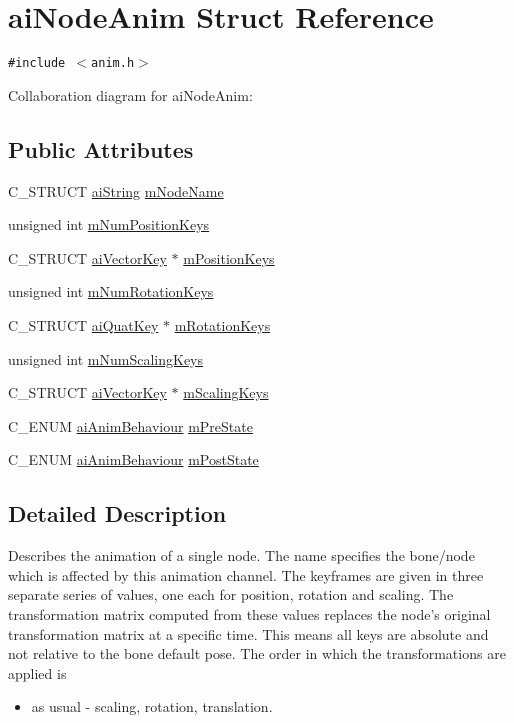\hypertarget{structai_node_anim}{
\section{aiNodeAnim Struct Reference}
\label{structai_node_anim}
}
{\tt \#include $<$anim.h$>$}

Collaboration diagram for aiNodeAnim:\subsection*{Public Attributes}
\begin{CompactItemize}
\item 
C\_\-STRUCT \hyperlink{structai_string}{aiString} \hyperlink{structai_node_anim_22a591381e75214ba03c6aaa770638f3}{mNodeName}
\item 
unsigned int \hyperlink{structai_node_anim_ab725313d31db70adab778a3c125103f}{mNumPositionKeys}
\item 
C\_\-STRUCT \hyperlink{structai_vector_key}{aiVectorKey} $\ast$ \hyperlink{structai_node_anim_983d0db426ac7e5fce442beb19552db3}{mPositionKeys}
\item 
unsigned int \hyperlink{structai_node_anim_ca7c78b89c4c64dcdf7619e105e0708c}{mNumRotationKeys}
\item 
C\_\-STRUCT \hyperlink{structai_quat_key}{aiQuatKey} $\ast$ \hyperlink{structai_node_anim_be1b0b8b0b30a3950cf09023868a07ac}{mRotationKeys}
\item 
unsigned int \hyperlink{structai_node_anim_28fa0fd84571ac79cb45a537192738f6}{mNumScalingKeys}
\item 
C\_\-STRUCT \hyperlink{structai_vector_key}{aiVectorKey} $\ast$ \hyperlink{structai_node_anim_4588122722d5148d6e590da820bdf35f}{mScalingKeys}
\item 
C\_\-ENUM \hyperlink{anim_8h_201b9e9429b82cd6423ff4a4daf01cef}{aiAnimBehaviour} \hyperlink{structai_node_anim_305c01b60886a07b69f04b1db6d7d3c5}{mPreState}
\item 
C\_\-ENUM \hyperlink{anim_8h_201b9e9429b82cd6423ff4a4daf01cef}{aiAnimBehaviour} \hyperlink{structai_node_anim_93cefd440cbaf587c136eb224d4a0327}{mPostState}
\end{CompactItemize}


\subsection{Detailed Description}
Describes the animation of a single node. The name specifies the bone/node which is affected by this animation channel. The keyframes are given in three separate series of values, one each for position, rotation and scaling. The transformation matrix computed from these values replaces the node's original transformation matrix at a specific time. This means all keys are absolute and not relative to the bone default pose. The order in which the transformations are applied is\begin{itemize}
\item as usual - scaling, rotation, translation.\end{itemize}


